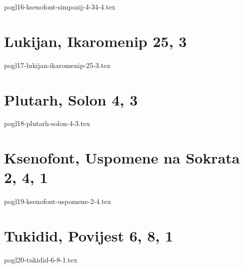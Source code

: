 \documentclass[a4paper,12pt,twoside]{report}
\begin{document}
{pogl16-ksenofont-simpozij-4-34-4.tex}

\chapter{Lukijan, Ikaromenip 25, 3}

{pogl17-lukijan-ikaromenip-25-3.tex}


\clearpage
\thispagestyle{empty}

\chapter{Plutarh, Solon 4, 3}


{pogl18-plutarh-solon-4-3.tex}

\chapter{Ksenofont, Uspomene na Sokrata 2, 4, 1}


{pogl19-ksenofont-uspomene-2-4.tex}


\clearpage
\thispagestyle{empty}

\chapter{Tukidid, Povijest 6, 8, 1}

{pogl20-tukidid-6-8-1.tex}

\clearpage
\thispagestyle{empty}


\tableofcontents
\end{document}
